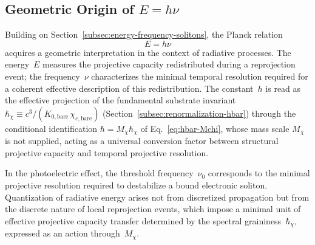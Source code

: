 \subsection{Geometric Origin of
\texorpdfstring{$E = h\nu$}{E = hν}}
  \label{subsec:energy-frequency-radiation}

  Building on Section~\ref{subsec:energy-frequency-solitons}, the Planck relation
  \begin{equation}
    E = h \nu
  \end{equation}
  acquires a geometric interpretation in the context of radiative processes.
  The energy~$E$ measures the projective capacity redistributed during a
  reprojection event; the frequency~$\nu$ characterizes the minimal
  temporal resolution required for a coherent effective description of this
  redistribution.
  The constant~$h$ is read as the effective projection of the fundamental
  substrate invariant
  $\hbar_\chi \equiv c^3 / (K_{0,\text{bare}}\,\chi_{c,\text{bare}})$
  (Section~\ref{subsec:renormalization-hbar}) through the conditional identification
  $\hbar = M_\chi\hbar_\chi$ of Eq.~\eqref{eq:hbar-Mchi}, whose mass scale $M_\chi$ is not supplied, acting as a
  universal
  conversion factor between structural projective capacity and temporal
  projective resolution.

  In the photoelectric effect, the threshold frequency~$\nu_0$ corresponds
  to the minimal projective resolution required to destabilize a bound
  electronic soliton.
  Quantization of radiative energy arises not from discretized propagation
  but from the discrete nature of local reprojection events, which impose
  a minimal unit of effective projective capacity transfer determined by the
  spectral graininess~$\hbar_\chi$, expressed as an action through~$M_\chi$.
